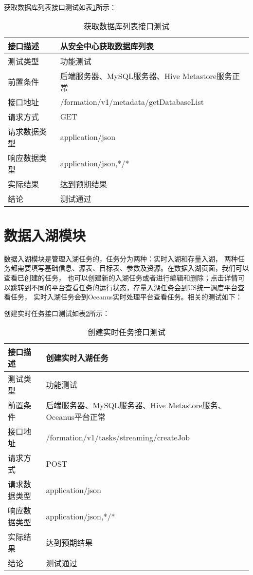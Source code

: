 获取数据库列表接口测试如表\ref{tab:exampletable8}所示：

\begin{table}[H]
  \centering
  \caption{获取数据库列表接口测试}
  \label{tab:exampletable8}
  \begin{tabular}{ll}
    \toprule
    接口描述         & 从安全中心获取数据库列表         \\
    \midrule
    测试类型         & 功能测试         \\
    前置条件         & 后端服务器、MySQL服务器、Hive Metastore服务正常         \\
    接口地址       & /formation/v1/metadata/getDatabaseList        \\
    请求方式         & GET      \\
    请求数据类型         & application/json     \\
    响应数据类型         & application/json,*/*           \\
    实际结果         & 达到预期结果           \\
    结论            & 测试通过           \\
    \bottomrule
  \end{tabular}
\end{table}

\section{数据入湖模块}

数据入湖模块是管理入湖任务的，任务分为两种：实时入湖和存量入湖，
两种任务都需要填写基础信息、源表、目标表、参数及资源。在数据入湖页面，我们可以查看已创建的任务，
也可以创建新的入湖任务或者进行编辑和删除；点击详情可以跳转到不同的平台查看任务的运行状态，存量入湖任务会到US统一调度平台查看任务，
实时入湖任务会到Oceanus实时处理平台查看任务。相关的测试如下：

创建实时任务接口测试如表\ref{tab:exampletable9}所示：

\begin{table}[H]
  \centering
  \caption{创建实时任务接口测试}
  \label{tab:exampletable9}
  \begin{tabular}{ll}
    \toprule
    接口描述         & 创建实时入湖任务         \\
    \midrule
    测试类型         & 功能测试         \\
    前置条件         & 后端服务器、MySQL服务器、Hive Metastore服务、Oceanus平台正常         \\
    接口地址       & /formation/v1/tasks/streaming/createJob        \\
    请求方式         & POST      \\
    请求数据类型         & application/json     \\
    响应数据类型         & application/json,*/*           \\
    实际结果         & 达到预期结果           \\
    结论            & 测试通过           \\
    \bottomrule
  \end{tabular}
\end{table}

